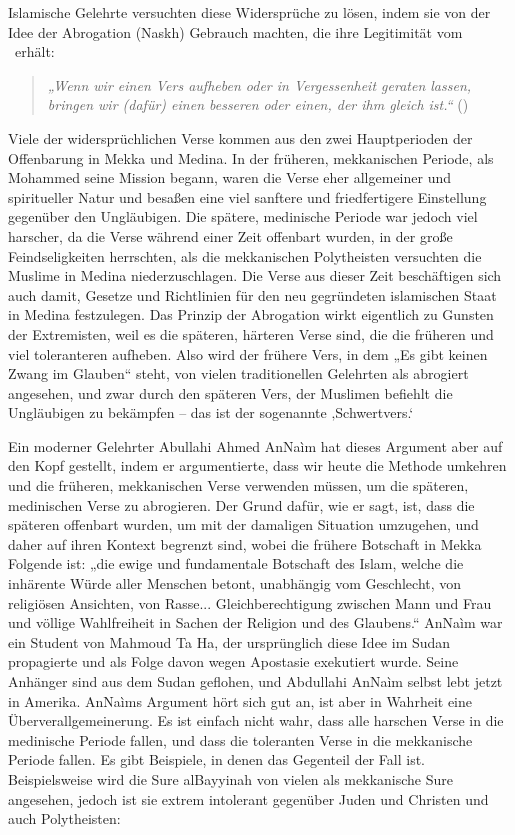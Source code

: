 \documentclass[12pt]{memoir}
\begin{document}
Islamische Gelehrte versuchten diese Widersprüche zu lösen,
indem sie von der Idee der Abrogation (Naskh) Gebrauch machten,
die ihre Legitimität vom \Quran\ erhält:

\begin{quote}
\emph{„Wenn wir einen Vers aufheben oder in Vergessenheit geraten lassen,
bringen wir (dafür) einen besseren oder einen, der ihm gleich ist.“}
()
\end{quote}

Viele der widersprüchlichen Verse kommen aus den zwei Hauptperioden
der Offenbarung in Mekka und Medina.
In der früheren, mekkanischen Periode, als Mohammed seine Mission begann,
waren die Verse eher allgemeiner und spiritueller Natur
und besaßen eine viel sanftere und friedfertigere Einstellung
gegenüber den Ungläubigen.
Die spätere, medinische Periode war jedoch viel harscher,
da die Verse während einer Zeit offenbart wurden,
in der große Feindseligkeiten herrschten,
als die mekkanischen Polytheisten versuchten
die Muslime in Medina niederzuschlagen.
Die Verse aus dieser Zeit beschäftigen sich auch damit,
Gesetze und Richtlinien für den neu gegründeten islamischen Staat
in Medina festzulegen.
Das Prinzip der Abrogation wirkt eigentlich zu Gunsten der Extremisten,
weil es die späteren, härteren Verse sind,
die die früheren und viel toleranteren aufheben.
Also wird der frühere Vers, in dem „Es gibt keinen Zwang im Glauben“ steht,
von vielen traditionellen Gelehrten als abrogiert angesehen,
und zwar durch den späteren Vers,
der Muslimen befiehlt die Ungläubigen zu bekämpfen –
das ist der sogenannte ‚Schwertvers.‘

Ein moderner Gelehrter Abullahi Ahmed An\–Na\`im hat dieses Argument
aber auf den Kopf gestellt, indem er argumentierte,
dass wir heute die Methode umkehren
und die früheren, mekkanischen Verse verwenden müssen,
um die späteren, medinischen Verse zu abrogieren.
Der Grund dafür, wie er sagt, ist, dass die späteren offenbart wurden,
um mit der damaligen Situation umzugehen,
und daher auf ihren Kontext begrenzt sind,
wobei die frühere Botschaft in Mekka Folgende ist:
„die ewige und fundamentale Botschaft des Islam,
welche die inhärente Würde aller Menschen betont,
unabhängig vom Geschlecht, von religiösen Ansichten, von Rasse...
Gleichberechtigung zwischen Mann und Frau und völlige Wahlfreiheit
in Sachen der Religion und des Glaubens.“
An\–Na\`im war ein Student von Mahmoud Ta Ha,
der ursprünglich diese Idee im Sudan propagierte
und als Folge davon wegen Apostasie exekutiert wurde.
Seine Anhänger sind aus dem Sudan geflohen,
und Abdullahi An\–Na\`im selbst lebt jetzt in Amerika.
An\–Na\`ims Argument hört sich gut an,
ist aber in Wahrheit eine Überverallgemeinerung.
Es ist einfach nicht wahr, dass alle harschen Verse
in die medinische Periode fallen,
und dass die toleranten Verse in die mekkanische Periode fallen.
Es gibt Beispiele, in denen das Gegenteil der Fall ist.
Beispielsweise wird die Sure al\–Bayyinah von vielen
als mekkanische Sure angesehen, jedoch ist sie extrem intolerant
gegenüber Juden und Christen und auch Polytheisten:
\end{document}
